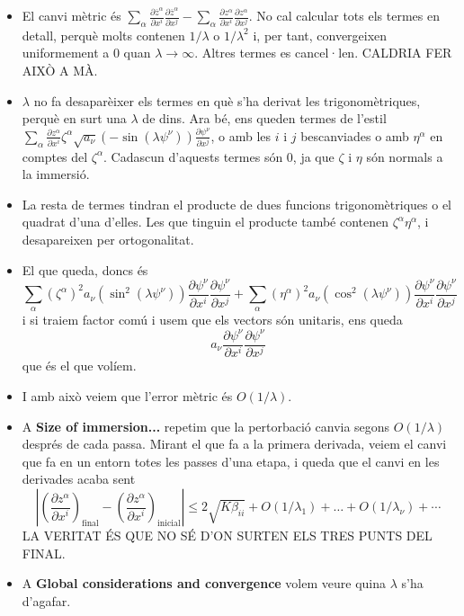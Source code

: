 {\begin{itemize}
    \item El canvi mètric és $\sum_\alpha\frac{\partial\overline{z}^\alpha}{\partial x^i}\frac{\partial\overline{z}^\alpha}{\partial x^j}-\sum_\alpha\frac{\partial z^\alpha}{\partial x^i}\frac{\partial z^\alpha}{\partial x^j}$. No cal calcular tots els termes en detall, perquè molts contenen $1/\lambda$ o $1/\lambda^2$ i, per tant, convergeixen uniformement a $0$ quan $\lambda\to\infty$. Altres termes es cancel·len. CALDRIA FER AIXÒ A MÀ.
    \item $\lambda$ no fa desaparèixer els termes en què s'ha derivat les trigonomètriques, perquè en surt una $\lambda$ de dins. Ara bé, ens queden termes de l'estil $\sum_\alpha\frac{\partial z^\alpha}{\partial x^i}\zeta^\alpha\sqrt{a_\nu}(-\sin(\lambda \psi^\nu))\frac{\partial\psi^\nu}{\partial x^j}$, o amb les $i$ i $j$ bescanviades o amb $\eta^\alpha$ en comptes del $\zeta^\alpha$. Cadascun d'aquests termes són $0$, ja que $\zeta$ i $\eta$ són normals a la immersió.
    \item La resta de termes tindran el producte de dues funcions trigonomètriques o el quadrat d'una d'elles. Les que tinguin el producte també contenen $\zeta^\alpha\eta^\alpha$, i desapareixen per ortogonalitat.
    \item El que queda, doncs és 
    $$\sum_\alpha (\zeta^\alpha)^2 a_\nu (\sin^2(\lambda \psi^\nu) ) \frac{\partial\psi^\nu}{\partial x^i}\frac{\partial\psi^\nu}{\partial x^j} + \sum_\alpha (\eta^\alpha)^2 a_\nu (\cos^2(\lambda \psi^\nu) ) \frac{\partial\psi^\nu}{\partial x^i}\frac{\partial\psi^\nu}{\partial x^j}$$
    i si traiem factor comú i usem que els vectors són unitaris, ens queda
    $$a_\nu\frac{\partial\psi^\nu}{\partial x^i}\frac{\partial\psi^\nu}{\partial x^j}$$
    que és el que volíem.
    \item I amb això veiem que l'error mètric és $O(1/\lambda)$.
    \item A \textbf{Size of immersion...} repetim que la pertorbació canvia segons $O(1/\lambda)$ després de cada passa. Mirant el que fa a la primera derivada, veiem el canvi que fa en un entorn totes les passes d'una etapa, i queda que el canvi en les derivades acaba sent $$\left|\left( \frac{\partial z^\alpha}{\partial x^i}\right)_{\text{final}}-\left( \frac{\partial z^\alpha}{\partial x^i}\right)_{\text{inicial}}\right| \le 2\sqrt{K\beta_{ii}}+O(1/\lambda_1)+\dots + O(1/\lambda_\nu)+\cdots$$ LA VERITAT ÉS QUE NO SÉ D'ON SURTEN ELS TRES PUNTS DEL FINAL.
    \item A \textbf{Global considerations and convergence} volem veure quina $\lambda$ s'ha d'agafar. 

\end{itemize}}
